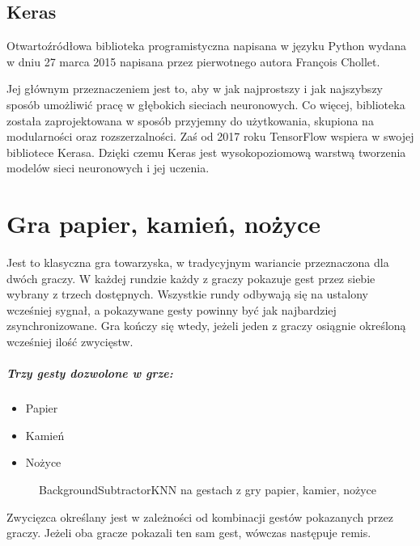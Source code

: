 \documentclass[a4paper,12pt,twoside,openany]{report}
\newcommand{\ImgPath}{.}
\begin{document}
\section{Keras}
Otwartoźródłowa biblioteka programistyczna napisana w języku Python wydana w dniu 27 marca 2015 napisana przez pierwotnego autora François Chollet. 

Jej głównym przeznaczeniem jest to, aby w jak najprostszy i  jak najszybszy sposób umożliwić pracę w głębokich sieciach neuronowych. Co więcej, biblioteka została zaprojektowana w sposób przyjemny do użytkowania, skupiona na modularności oraz rozszerzalności. Zaś od 2017 roku TensorFlow wspiera w swojej bibliotece Kerasa. Dzięki czemu Keras jest wysokopoziomową warstwą tworzenia modelów sieci neuronowych i jej uczenia.

\chapter{Gra papier, kamień, nożyce}
Jest to klasyczna gra towarzyska, w tradycyjnym wariancie przeznaczona dla dwóch graczy. W każdej rundzie każdy z graczy pokazuje gest przez siebie wybrany z trzech dostępnych. Wszystkie rundy odbywają się na ustalony wcześniej sygnał, a pokazywane gesty powinny być jak najbardziej zsynchronizowane. Gra kończy się wtedy, jeżeli jeden z graczy osiągnie określoną wcześniej ilość zwycięstw.


\paragraph{Trzy gesty dozwolone w grze:}
\begin{itemize} 
	\item Papier
	\item Kamień
	\item Nożyce
\end{itemize} 

\begin{figure}[H]
	\centering
	\caption{BackgroundSubtractorKNN na gestach z gry papier, kamier, nożyce}
\end{figure}

Zwycięzca określany jest w zależności od kombinacji gestów pokazanych przez graczy. Jeżeli oba gracze pokazali ten sam gest, wówczas następuje remis. 
\end{document}
